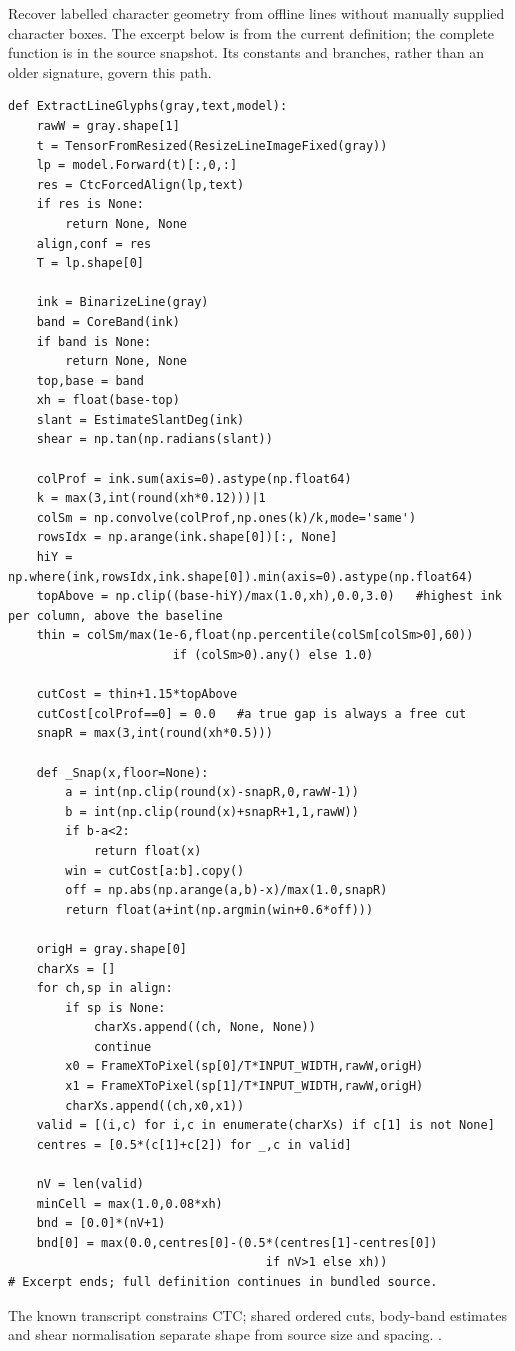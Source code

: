 Recover labelled character geometry from offline lines without manually supplied character boxes. The excerpt below is from the current definition; the complete function is in the source snapshot. Its constants and branches, rather than an older signature, govern this path.


\begin{lstlisting}[style=plain]
def ExtractLineGlyphs(gray,text,model):
    rawW = gray.shape[1]
    t = TensorFromResized(ResizeLineImageFixed(gray))
    lp = model.Forward(t)[:,0,:]
    res = CtcForcedAlign(lp,text)
    if res is None:
        return None, None
    align,conf = res
    T = lp.shape[0]

    ink = BinarizeLine(gray)
    band = CoreBand(ink)
    if band is None:
        return None, None
    top,base = band
    xh = float(base-top)
    slant = EstimateSlantDeg(ink)
    shear = np.tan(np.radians(slant))

    colProf = ink.sum(axis=0).astype(np.float64)
    k = max(3,int(round(xh*0.12)))|1
    colSm = np.convolve(colProf,np.ones(k)/k,mode='same')
    rowsIdx = np.arange(ink.shape[0])[:, None]
    hiY = np.where(ink,rowsIdx,ink.shape[0]).min(axis=0).astype(np.float64)
    topAbove = np.clip((base-hiY)/max(1.0,xh),0.0,3.0)   #highest ink per column, above the baseline
    thin = colSm/max(1e-6,float(np.percentile(colSm[colSm>0],60))
                       if (colSm>0).any() else 1.0)

    cutCost = thin+1.15*topAbove
    cutCost[colProf==0] = 0.0   #a true gap is always a free cut
    snapR = max(3,int(round(xh*0.5)))

    def _Snap(x,floor=None):
        a = int(np.clip(round(x)-snapR,0,rawW-1))
        b = int(np.clip(round(x)+snapR+1,1,rawW))
        if b-a<2:
            return float(x)
        win = cutCost[a:b].copy()
        off = np.abs(np.arange(a,b)-x)/max(1.0,snapR)
        return float(a+int(np.argmin(win+0.6*off)))

    origH = gray.shape[0]
    charXs = []
    for ch,sp in align:
        if sp is None:
            charXs.append((ch, None, None))
            continue
        x0 = FrameXToPixel(sp[0]/T*INPUT_WIDTH,rawW,origH)
        x1 = FrameXToPixel(sp[1]/T*INPUT_WIDTH,rawW,origH)
        charXs.append((ch,x0,x1))
    valid = [(i,c) for i,c in enumerate(charXs) if c[1] is not None]
    centres = [0.5*(c[1]+c[2]) for _,c in valid]

    nV = len(valid)
    minCell = max(1.0,0.08*xh)
    bnd = [0.0]*(nV+1)
    bnd[0] = max(0.0,centres[0]-(0.5*(centres[1]-centres[0])
                                    if nV>1 else xh))
# Excerpt ends; full definition continues in bundled source.
\end{lstlisting}
The known transcript constrains CTC; shared ordered cuts, body-band estimates and shear normalisation separate shape from source size and spacing. \cite{graves2006,vinciarelli2001,code2026}.


